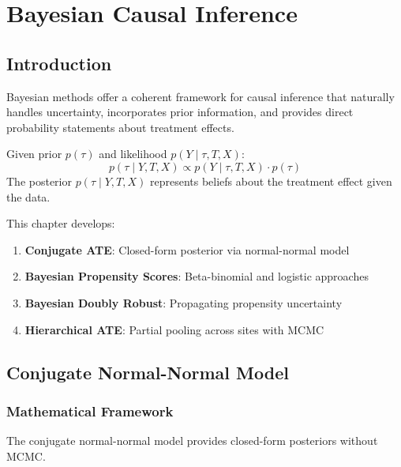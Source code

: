 \chapter{Bayesian Causal Inference}
\label{ch:bayesian}

\section{Introduction}

Bayesian methods offer a coherent framework for causal inference that naturally handles uncertainty, incorporates prior information, and provides direct probability statements about treatment effects.

\begin{definition}
Given prior $p(\tau)$ and likelihood $p(Y \mid \tau, T, X)$:
\begin{equation}
p(\tau \mid Y, T, X) \propto p(Y \mid \tau, T, X) \cdot p(\tau)
\end{equation}
The posterior $p(\tau \mid Y, T, X)$ represents beliefs about the treatment effect given the data.
\end{definition}

This chapter develops:
\begin{enumerate}
\item \textbf{Conjugate ATE}: Closed-form posterior via normal-normal model
\item \textbf{Bayesian Propensity Scores}: Beta-binomial and logistic approaches
\item \textbf{Bayesian Doubly Robust}: Propagating propensity uncertainty
\item \textbf{Hierarchical ATE}: Partial pooling across sites with MCMC
\end{enumerate}


\section{Conjugate Normal-Normal Model}

\subsection{Mathematical Framework}

The conjugate normal-normal model provides closed-form posteriors without MCMC.

